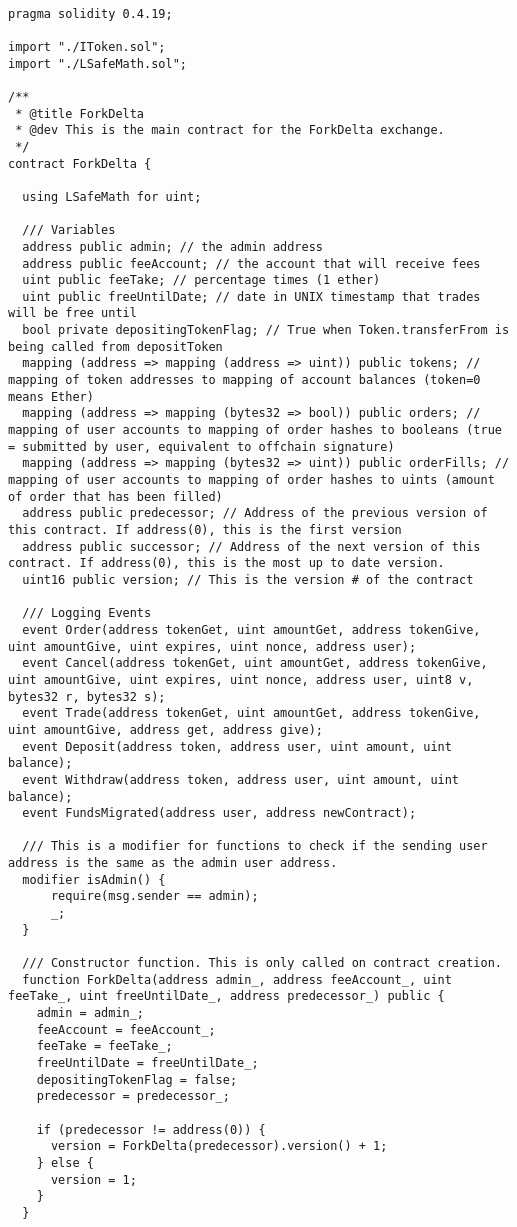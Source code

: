 \documentclass{article}
\begin{document}
\begin{lstlisting}

pragma solidity 0.4.19;

import "./IToken.sol";
import "./LSafeMath.sol";

/**
 * @title ForkDelta
 * @dev This is the main contract for the ForkDelta exchange.
 */
contract ForkDelta {
  
  using LSafeMath for uint;

  /// Variables
  address public admin; // the admin address
  address public feeAccount; // the account that will receive fees
  uint public feeTake; // percentage times (1 ether)
  uint public freeUntilDate; // date in UNIX timestamp that trades will be free until
  bool private depositingTokenFlag; // True when Token.transferFrom is being called from depositToken
  mapping (address => mapping (address => uint)) public tokens; // mapping of token addresses to mapping of account balances (token=0 means Ether)
  mapping (address => mapping (bytes32 => bool)) public orders; // mapping of user accounts to mapping of order hashes to booleans (true = submitted by user, equivalent to offchain signature)
  mapping (address => mapping (bytes32 => uint)) public orderFills; // mapping of user accounts to mapping of order hashes to uints (amount of order that has been filled)
  address public predecessor; // Address of the previous version of this contract. If address(0), this is the first version
  address public successor; // Address of the next version of this contract. If address(0), this is the most up to date version.
  uint16 public version; // This is the version # of the contract

  /// Logging Events
  event Order(address tokenGet, uint amountGet, address tokenGive, uint amountGive, uint expires, uint nonce, address user);
  event Cancel(address tokenGet, uint amountGet, address tokenGive, uint amountGive, uint expires, uint nonce, address user, uint8 v, bytes32 r, bytes32 s);
  event Trade(address tokenGet, uint amountGet, address tokenGive, uint amountGive, address get, address give);
  event Deposit(address token, address user, uint amount, uint balance);
  event Withdraw(address token, address user, uint amount, uint balance);
  event FundsMigrated(address user, address newContract);

  /// This is a modifier for functions to check if the sending user address is the same as the admin user address.
  modifier isAdmin() {
      require(msg.sender == admin);
      _;
  }

  /// Constructor function. This is only called on contract creation.
  function ForkDelta(address admin_, address feeAccount_, uint feeTake_, uint freeUntilDate_, address predecessor_) public {
    admin = admin_;
    feeAccount = feeAccount_;
    feeTake = feeTake_;
    freeUntilDate = freeUntilDate_;
    depositingTokenFlag = false;
    predecessor = predecessor_;
    
    if (predecessor != address(0)) {
      version = ForkDelta(predecessor).version() + 1;
    } else {
      version = 1;
    }
  }

\end{lstlisting}
\end{document}
